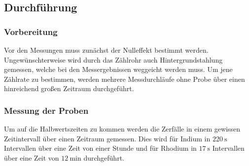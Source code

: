\subsection{Durchführung}
\label{sec:durchführung}

\subsubsection{Vorbereitung}
Vor den Messungen muss zunächst der Nulleffekt bestimmt werden.
Ungewünschterweise wird durch das Zählrohr auch Hintergrundstahlung gemessen, welche bei den Messergebnissen weggeicht werden muss.
Um jene Zählrate zu bestimmen, werden mehrere Messdurchläufe ohne Probe über einen hinreichend großen Zeitraum durchgeführt.

\subsubsection{Messung der Proben}
Um auf die Halbwertszeiten zu kommen werden die Zerfälle in einem gewissen Zeitintervall über einen Zeitraum gemessen.
Dies wird für Indium in $\SI{220}{\second}$ Intervallen über eine Zeit von einer Stunde und für Rhodium in $\SI{17}{\second}$ Intervallen über eine Zeit von $\SI{12}{\minute}$ durchgeführt.
